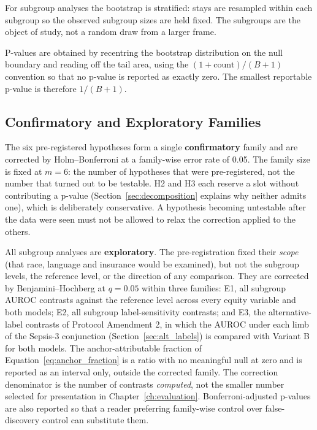 For subgroup analyses the bootstrap is stratified: stays are resampled within
each subgroup so the observed subgroup sizes are held fixed. The subgroups are
the object of study, not a random draw from a larger frame.

P-values are obtained by recentring the bootstrap distribution on the null
boundary and reading off the tail area, using the $(1 + \text{count})/(B + 1)$
convention so that no p-value is reported as exactly zero. The smallest
reportable p-value is therefore $1/(B+1)$.

\subsection{Confirmatory and Exploratory Families}

The six pre-registered hypotheses form a single \textbf{confirmatory} family
and are corrected by Holm--Bonferroni at a family-wise error rate of 0.05. The
family size is fixed at $m = 6$: the number of hypotheses that were
pre-registered, not the number that turned out to be testable. H2 and H3 each
reserve a slot without contributing a p-value (Section~\ref{sec:decomposition}
explains why neither admits one), which is deliberately conservative. A
hypothesis becoming untestable after the data were seen must not be allowed to
relax the correction applied to the others.

All subgroup analyses are \textbf{exploratory}. The pre-registration fixed
their \emph{scope} (that race, language and insurance would be examined),
but not the subgroup levels, the reference level, or the direction of any
comparison. They are corrected by Benjamini--Hochberg at $q = 0.05$ within
three families: E1, all subgroup AUROC contrasts against the reference level
across every equity variable and both models; E2, all subgroup
label-sensitivity contrasts; and E3, the alternative-label contrasts of
Protocol Amendment 2, in which the AUROC under each limb of the Sepsis-3
conjunction (Section~\ref{sec:alt_labels}) is compared with Variant B for both
models. The anchor-attributable fraction of
Equation~\ref{eq:anchor_fraction} is a ratio with no meaningful null at zero
and is reported as an interval only, outside the corrected family. The
correction denominator is the number of
contrasts \emph{computed}, not the smaller number selected for presentation in
Chapter~\ref{ch:evaluation}. Bonferroni-adjusted p-values are also reported so
that a reader preferring family-wise control over false-discovery control can
substitute them.

